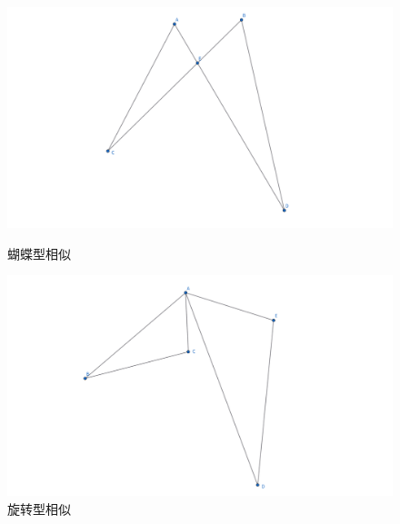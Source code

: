 \begin{figure}[h]
    \centering
    \hfill %
    \begin{minipage}[t]{0.45\textwidth}
    \centering
    \includegraphics[width=0.8\linewidth]{figures/蝴蝶型相似.png}
    \caption{蝴蝶型相似}
    \end{minipage}
    \hfill %
    \begin{minipage}[t]{0.45\textwidth}
    \centering
    \includegraphics[width=0.8\linewidth]{figures/旋转型相似.png}
    \caption{旋转型相似}
    \end{minipage}
\end{figure}


